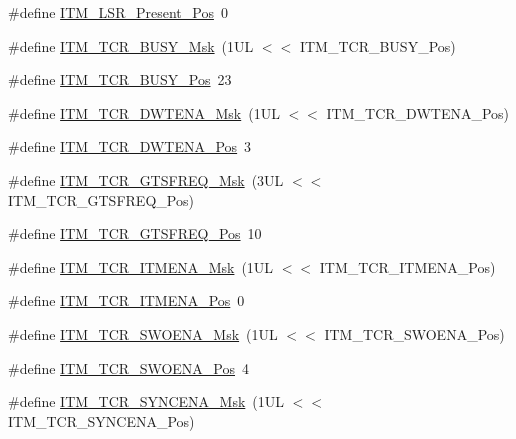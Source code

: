\begin{DoxyCompactItemize}
\item 
\#define \hyperlink{group__CMSIS__ITM_gaf5740689cf14564d3f3fd91299b6c88d}{I\+T\+M\+\_\+\+L\+S\+R\+\_\+\+Present\+\_\+\+Pos}~0
\item 
\#define \hyperlink{group__CMSIS__ITM_ga43ad7cf33de12f2ef3a412d4f354c60f}{I\+T\+M\+\_\+\+T\+C\+R\+\_\+\+B\+U\+S\+Y\+\_\+\+Msk}~(1\+U\+L $<$$<$ I\+T\+M\+\_\+\+T\+C\+R\+\_\+\+B\+U\+S\+Y\+\_\+\+Pos)
\item 
\#define \hyperlink{group__CMSIS__ITM_ga9174ad4a36052c377cef4e6aba2ed484}{I\+T\+M\+\_\+\+T\+C\+R\+\_\+\+B\+U\+S\+Y\+\_\+\+Pos}~23
\item 
\#define \hyperlink{group__CMSIS__ITM_ga98ea1c596d43d3633a202f9ee746cf70}{I\+T\+M\+\_\+\+T\+C\+R\+\_\+\+D\+W\+T\+E\+N\+A\+\_\+\+Msk}~(1\+U\+L $<$$<$ I\+T\+M\+\_\+\+T\+C\+R\+\_\+\+D\+W\+T\+E\+N\+A\+\_\+\+Pos)
\item 
\#define \hyperlink{group__CMSIS__ITM_ga30e83ebb33aa766070fe3d1f27ae820e}{I\+T\+M\+\_\+\+T\+C\+R\+\_\+\+D\+W\+T\+E\+N\+A\+\_\+\+Pos}~3
\item 
\#define \hyperlink{group__CMSIS__ITM_gade862cf009827f7f6748fc44c541b067}{I\+T\+M\+\_\+\+T\+C\+R\+\_\+\+G\+T\+S\+F\+R\+E\+Q\+\_\+\+Msk}~(3\+U\+L $<$$<$ I\+T\+M\+\_\+\+T\+C\+R\+\_\+\+G\+T\+S\+F\+R\+E\+Q\+\_\+\+Pos)
\item 
\#define \hyperlink{group__CMSIS__ITM_ga96c7c7cbc0d98426c408090b41f583f1}{I\+T\+M\+\_\+\+T\+C\+R\+\_\+\+G\+T\+S\+F\+R\+E\+Q\+\_\+\+Pos}~10
\item 
\#define \hyperlink{group__CMSIS__ITM_ga7dd53e3bff24ac09d94e61cb595cb2d9}{I\+T\+M\+\_\+\+T\+C\+R\+\_\+\+I\+T\+M\+E\+N\+A\+\_\+\+Msk}~(1\+U\+L $<$$<$ I\+T\+M\+\_\+\+T\+C\+R\+\_\+\+I\+T\+M\+E\+N\+A\+\_\+\+Pos)
\item 
\#define \hyperlink{group__CMSIS__ITM_ga3286b86004bce7ffe17ee269f87f8d9d}{I\+T\+M\+\_\+\+T\+C\+R\+\_\+\+I\+T\+M\+E\+N\+A\+\_\+\+Pos}~0
\item 
\#define \hyperlink{group__CMSIS__ITM_ga97476cb65bab16a328b35f81fd02010a}{I\+T\+M\+\_\+\+T\+C\+R\+\_\+\+S\+W\+O\+E\+N\+A\+\_\+\+Msk}~(1\+U\+L $<$$<$ I\+T\+M\+\_\+\+T\+C\+R\+\_\+\+S\+W\+O\+E\+N\+A\+\_\+\+Pos)
\item 
\#define \hyperlink{group__CMSIS__ITM_ga7a380f0c8078f6560051406583ecd6a5}{I\+T\+M\+\_\+\+T\+C\+R\+\_\+\+S\+W\+O\+E\+N\+A\+\_\+\+Pos}~4
\item 
\#define \hyperlink{group__CMSIS__ITM_gac89b74a78701c25b442105d7fe2bbefb}{I\+T\+M\+\_\+\+T\+C\+R\+\_\+\+S\+Y\+N\+C\+E\+N\+A\+\_\+\+Msk}~(1\+U\+L $<$$<$ I\+T\+M\+\_\+\+T\+C\+R\+\_\+\+S\+Y\+N\+C\+E\+N\+A\+\_\+\+Pos)

\end{DoxyCompactItemize}
